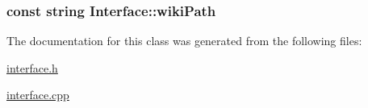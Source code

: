 \subsubsection[{wiki\+Path}]{\setlength{\rightskip}{0pt plus 5cm}const string Interface\+::wiki\+Path\hspace{0.3cm}{\ttfamily [private]}}\label{class_interface_a2dca5f7e2ddb5d7bf82c9eaf8f3a17eb}


The documentation for this class was generated from the following files\+:\begin{DoxyCompactItemize}
\item 
\hyperlink{interface_8h}{interface.\+h}\item 
\hyperlink{interface_8cpp}{interface.\+cpp}\end{DoxyCompactItemize}
